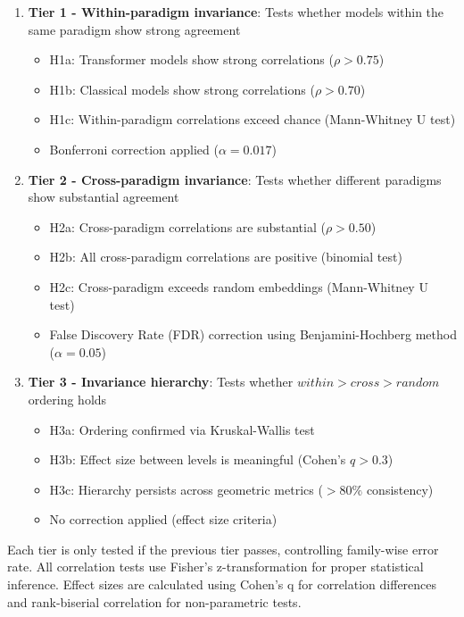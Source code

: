 \documentclass[11pt,letterpaper]{article}
\begin{document}
\begin{enumerate}
\item \textbf{Tier 1 - Within-paradigm invariance}: Tests whether models within the same paradigm show strong agreement
   \begin{itemize}
   \item H1a: Transformer models show strong correlations ($\rho > 0.75$)
   \item H1b: Classical models show strong correlations ($\rho > 0.70$)
   \item H1c: Within-paradigm correlations exceed chance (Mann-Whitney U test)
   \item Bonferroni correction applied ($\alpha = 0.017$)
   \end{itemize}

\item \textbf{Tier 2 - Cross-paradigm invariance}: Tests whether different paradigms show substantial agreement
   \begin{itemize}
   \item H2a: Cross-paradigm correlations are substantial ($\rho > 0.50$)
   \item H2b: All cross-paradigm correlations are positive (binomial test)
   \item H2c: Cross-paradigm exceeds random embeddings (Mann-Whitney U test)
   \item False Discovery Rate (FDR) correction using Benjamini-Hochberg method ($\alpha = 0.05$)
   \end{itemize}

\item \textbf{Tier 3 - Invariance hierarchy}: Tests whether $within > cross > random$ ordering holds
   \begin{itemize}
   \item H3a: Ordering confirmed via Kruskal-Wallis test
   \item H3b: Effect size between levels is meaningful (Cohen's $q > 0.3$)
   \item H3c: Hierarchy persists across geometric metrics ($> 80\%$ consistency)
   \item No correction applied (effect size criteria)
   \end{itemize}
\end{enumerate}

Each tier is only tested if the previous tier passes, controlling family-wise error rate. All correlation tests use Fisher's z-transformation for proper statistical inference. Effect sizes are calculated using Cohen's q for correlation differences and rank-biserial correlation for non-parametric tests.
\end{document}
